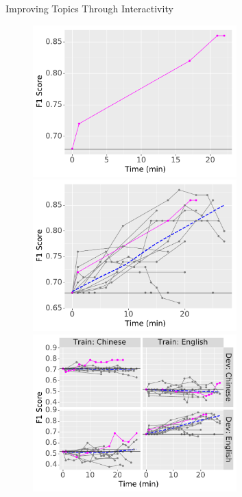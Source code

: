 \begin{frame}{Improving Topics Through Interactivity}
\begin{figure}
\begin{overprint}
 \centerline{\includegraphics[width=0.7\textwidth]{topic_models/mtanchor/user_exp1.pdf}}
 \centerline{\includegraphics[width=0.7\textwidth]{topic_models/mtanchor/user_exp2.pdf}}
 \centerline{\includegraphics[width=0.7\textwidth]{topic_models/mtanchor/user_exp3.pdf}}
\end{overprint}
\end{figure}
\end{frame}

